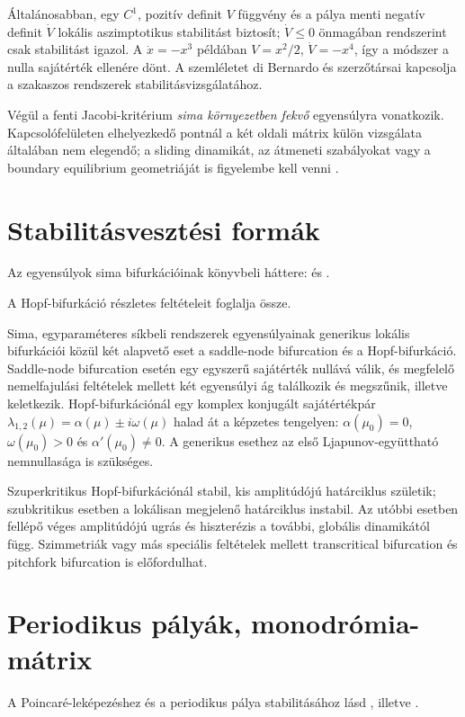 Általánosabban, egy $C^1$, pozitív definit $V$ függvény és a pálya menti negatív definit $\dot V$ lokális aszimptotikus stabilitást biztosít; $\dot V\leq0$ önmagában rendszerint csak stabilitást igazol. A $\dot x=-x^3$ példában $V=x^2/2$, $\dot V=-x^4$, így a módszer a nulla sajátérték ellenére dönt. A szemléletet di Bernardo és szerzőtársai \cite[2.1.3. és 2.4.1. szakasz]{dib} kapcsolja a szakaszos rendszerek stabilitásvizsgálatához.

Végül a fenti Jacobi-kritérium \emph{sima környezetben fekvő} egyensúlyra vonatkozik. Kapcsolófelületen elhelyezkedő pontnál a két oldali mátrix külön vizsgálata általában nem elegendő; a sliding dinamikát, az átmeneti szabályokat vagy a boundary equilibrium geometriáját is figyelembe kell venni \cite[2.4.1. szakasz és 5. fejezet]{dib}.

\section{Stabilitásvesztési formák}
Az egyensúlyok sima bifurkációinak könyvbeli háttere: \cite[2.1.6. szakasz]{dib} és \cite[3.1--3.5. szakasz]{kuznetsov_book}.

A Hopf-bifurkáció részletes feltételeit \cite{kuznetsov} foglalja össze.

Sima, egyparaméteres síkbeli rendszerek egyensúlyainak generikus lokális bifurkációi közül két alapvető eset a saddle-node bifurcation és a Hopf-bifurkáció. Saddle-node bifurcation esetén egy egyszerű sajátérték nullává válik, és megfelelő nemelfajulási feltételek mellett két egyensúlyi ág találkozik és megszűnik, illetve keletkezik. Hopf-bifurkációnál egy komplex konjugált sajátértékpár $\lambda_{1,2}(\mu)=\alpha(\mu)\pm i\omega(\mu)$ halad át a képzetes tengelyen: $\alpha(\mu_0)=0$, $\omega(\mu_0)>0$ és $\alpha'(\mu_0)\neq0$. A generikus esethez az első Ljapunov-együttható nemnullasága is szükséges.

Szuperkritikus Hopf-bifurkációnál stabil, kis amplitúdójú határciklus születik; szubkritikus esetben a lokálisan megjelenő határciklus instabil. Az utóbbi esetben fellépő véges amplitúdójú ugrás és hiszterézis a további, globális dinamikától függ. Szimmetriák vagy más speciális feltételek mellett transcritical bifurcation és pitchfork bifurcation is előfordulhat.

\section{Periodikus pályák, monodrómia-mátrix}
A Poincaré-leképezéshez és a periodikus pálya stabilitásához lásd \cite[2.1.5. szakasz]{dib}, illetve \cite[1.5. és 2.2.3. szakasz]{kuznetsov_book}.


